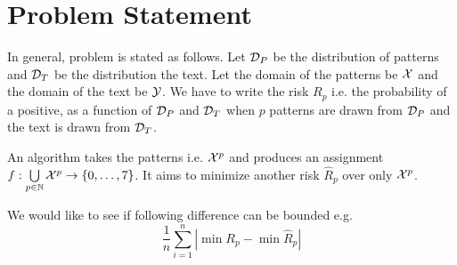 \section{Problem Statement}

In general, problem is stated as follows. Let $\mathcal{D}_{P}$ be the distribution of patterns and $\mathcal{D}_T$ be the distribution the text. Let the domain of the patterns be $\mathcal{X}$ and the domain of the text be $\mathcal{Y}$. We have to write the risk $R_p$ i.e. the probability of a positive, as a function of $\mathcal{D}_P$ and $\mathcal{D}_T$ when $p$ patterns are drawn from $\mathcal{D}_P$ and the text is drawn from $\mathcal{D}_T$.

An algorithm takes the patterns i.e. $\mathcal{X}^p$ and produces an assignment $f:\bigcup\limits_{p\in {\mathbb{N}}} \mathcal{X}^p \to \{0,\ldots, 7\}$. It aims to minimize another risk $\hat{R}_p$ over only $\mathcal{X}^p$.

We would like to see if following difference can be bounded e.g.
$$\frac{1}{n}\sum_{i=1}^n \left|\min R_p - \min \hat{R}_p\right|$$
